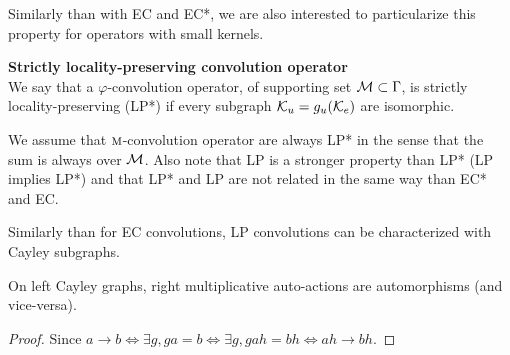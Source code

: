 Similarly than with EC and EC*, we are also interested to particularize this property for operators with small kernels.

\begin{definition}\textbf{Strictly locality-preserving convolution operator}\\
We say that a $\varphi$-convolution operator, of supporting set $\mathcal{M} \subset \Gamma$, is strictly locality-preserving (LP*) if every subgraph  $\mathcal{K}_u = g_u(\mathcal{K}_e)$ are isomorphic.
\label{def:lpp}
\end{definition}

\begin{remark}
We assume that $\operatorname{\textsc{m}}$-convolution operator are always LP* in the sense that the sum is always over $\mathcal{M}$. Also note that LP is a stronger property than LP* (\ie LP implies LP*) and that LP* and LP are not related in the same way than EC* and EC.
\end{remark}

Similarly than for EC convolutions, LP convolutions can be characterized with Cayley subgraphs.

\begin{lemma}
On left Cayley graphs, right multiplicative auto-actions are automorphisms (and vice-versa).
\label{lem:lat}
\end{lemma}
\begin{proof}
Since $a \rightarrow b \Leftrightarrow \exists g, ga = b \Leftrightarrow \exists g, gah = bh \Leftrightarrow ah \rightarrow bh$.
\end{proof}

